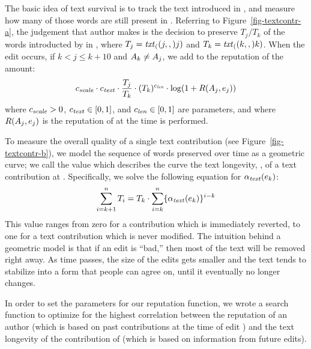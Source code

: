   The basic idea of text survival is to track the text introduced in
  , and measure how many of those words are
  still present in .
  Referring to Figure~\ref{fig-textcontr-a}, the judgement
  that author  makes is the
  decision to preserve $T_j / T_k$ of the words introducted
  by  in , where
  $T_j = \mathit{txt}_{(}(j,,)j)$ and $T_k = \mathit{txt}_{(}(k,,)k)$.
  When the edit  occurs, if
  $k < j \leq k+10$ and $A_{k} \neq A_{j}$,
  we add to the reputation
  of  the amount:
  \[
    {c_{{\text{\textit{scale}}}}} \cdot {c_{{\text{\textit{text}}}}} \cdot \frac{T_j}{T_k}
    \cdot (T_k)^{c_{{\text{\textit{len}}}}} \cdot \log(1 + R(A_{j},e_{j}))
  \]
  where ${c_{{\text{\textit{scale}}}}} > 0$, ${c_{{\text{\textit{text}}}}} \in [0,1]$, and ${c_{{\text{\textit{len}}}}} \in
  [0,1]$ are parameters, and where $R(A_{j},e_{j})$
  is the reputation of  at the time  is performed.

  To measure the overall quality of a single text contribution
  (see Figure~\ref{fig-textcontr-b}), we model the sequence of
  words preserved over time as a geometric curve; we call the
  value which describes the curve
  the text longevity, \tlong, of a text contribution at .
  Specifically, we solve the following equation for $\alpha_\text{\textit{text}}(e_{k})$:
  \begin{equation*}
  	\sum_{i=k+1}^n T_i = T_k \cdot
		\sum_{i=k}^n \{ \alpha_\text{\textit{text}}(e_{k}) \}^{i-k}
  \end{equation*}
  This value ranges from zero for a contribution which is immediately
  reverted, to one for a text contribution which is never modified.
  The intuition behind a geometric model is that if an edit is
  ``bad,'' then most of the text will be removed right away.
  As time passes, the size of the edits gets smaller and
  the text tends to stabilize into a form
  that people can agree on, until it eventually no longer changes.

  In order to set the parameters for our reputation function,
  we wrote a search function to optimize for the highest
  correlation between the reputation of an author (which is
  based on past contributions at the time of edit )
  and the text longevity of the contribution of 
  (which is based on information from future edits).

